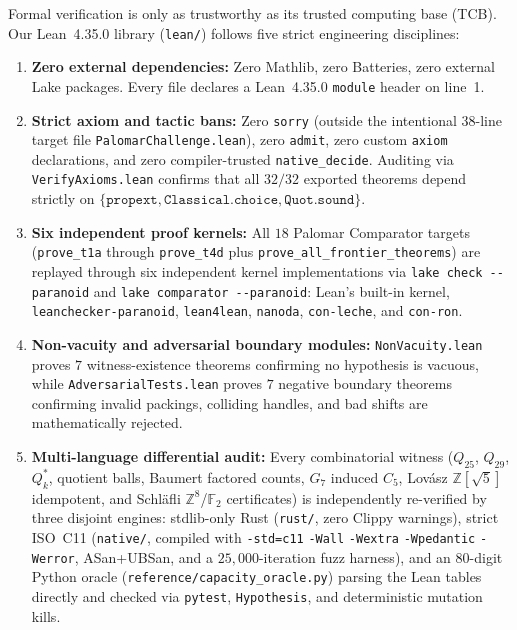 \documentclass[11pt,reqno]{amsart}
\theoremstyle{definition}
\newcommand{\Z}{\mathbb{Z}}
\newcommand{\F}{\mathbb{F}}
\newcommand{\lean}[1]{\nolinkurl{#1}}
\begin{document}
Formal verification is only as trustworthy as its trusted computing base (TCB). Our Lean~4.35.0 library (\texttt{lean/}) follows five strict engineering disciplines:
\begin{enumerate}[leftmargin=2em,itemsep=2pt]
  \item \textbf{Zero external dependencies:} Zero Mathlib, zero Batteries, zero external Lake packages. Every file declares a Lean~4.35.0 \texttt{module} header on line~1.
  \item \textbf{Strict axiom and tactic bans:} Zero \texttt{sorry} (outside the intentional 38-line target file \lean{PalomarChallenge.lean}), zero \texttt{admit}, zero custom \texttt{axiom} declarations, and zero compiler-trusted \texttt{native\_decide}. Auditing via \lean{VerifyAxioms.lean} confirms that all $32/32$ exported theorems depend strictly on $\{\texttt{propext}, \texttt{Classical.choice}, \texttt{Quot.sound}\}$.
  \item \textbf{Six independent proof kernels:} All $18$ Palomar Comparator targets (\lean{prove_t1a} through \lean{prove_t4d} plus \lean{prove_all_frontier_theorems}) are replayed through six independent kernel implementations via \texttt{lake check -{}-paranoid} and \texttt{lake comparator -{}-paranoid}: Lean's built-in kernel, \lean{leanchecker-paranoid}, \lean{lean4lean}, \lean{nanoda}, \lean{con-leche}, and \lean{con-ron}.
  \item \textbf{Non-vacuity and adversarial boundary modules:} \lean{NonVacuity.lean} proves $7$ witness-existence theorems confirming no hypothesis is vacuous, while \lean{AdversarialTests.lean} proves $7$ negative boundary theorems confirming invalid packings, colliding handles, and bad shifts are mathematically rejected.
  \item \textbf{Multi-language differential audit:} Every combinatorial witness ($Q_{25}$, $Q_{29}$, $Q^*_k$, quotient balls, Baumert factored counts, $G_7$ induced $C_5$, Lovász $\Z[\sqrt{5}]$ idempotent, and Schläfli $\Z^8$/$\F_2$ certificates) is independently re-verified by three disjoint engines: stdlib-only Rust (\texttt{rust/}, zero Clippy warnings), strict ISO~C11 (\texttt{native/}, compiled with \texttt{-std=c11} \texttt{-Wall} \texttt{-Wextra} \texttt{-Wpedantic} \texttt{-Werror}, ASan+UBSan, and a $25{,}000$-iteration fuzz harness), and an $80$-digit Python oracle (\lean{reference/capacity_oracle.py}) parsing the Lean tables directly and checked via \texttt{pytest}, \texttt{Hypothesis}, and deterministic mutation kills.
\end{enumerate}
\end{document}
